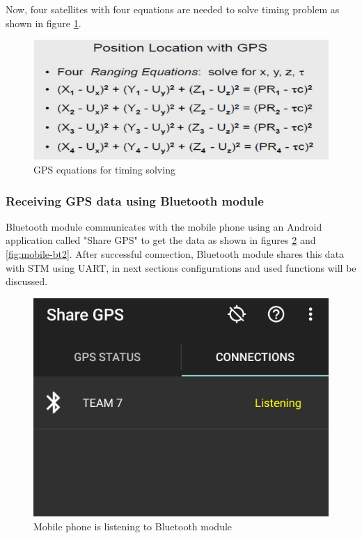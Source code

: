 Now, four satellites with four equations are needed to solve timing problem as shown in figure \ref{fig:gps-equationss-time}.

    \begin{figure}[h]
    \centering
    \includegraphics[width = \textwidth]{figure/5_9.png}
    \caption{GPS equations for timing solving}
    \label{fig:gps-equationss-time}
    \end{figure}
 \newpage   
\subsubsection{Receiving GPS data using Bluetooth module}

Bluetooth module communicates with the mobile phone using an Android application called "Share GPS" to get the data as shown in figures \ref{fig:mobile-bt1} and \ref{fig:mobile-bt2}. After successful connection, Bluetooth module shares this data with STM using UART, in next sections configurations and used functions will be discussed.\newpage

\begin{figure}[h]
    \centering
    \includegraphics[width = .8\textwidth]{figure/5_10.jpg}
    \caption{Mobile phone is listening to Bluetooth module}
    \label{fig:mobile-bt1}
    \end{figure}
    
